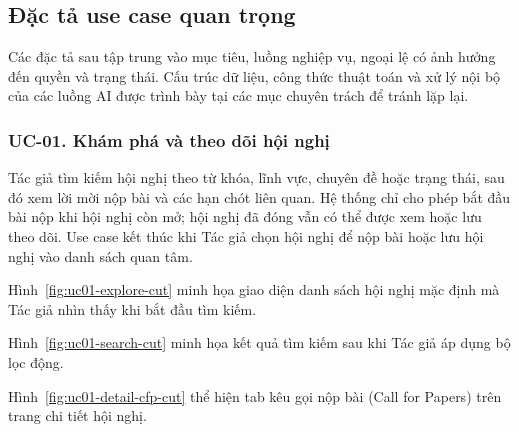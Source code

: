 \subsection{Đặc tả use case quan trọng}
\label{subsec:ch3-usecase-details-cut}

Các đặc tả sau tập trung vào mục tiêu, luồng nghiệp vụ, ngoại lệ có ảnh hưởng đến quyền và trạng thái. Cấu trúc dữ liệu, công thức thuật toán và xử lý nội bộ của các luồng AI được trình bày tại các mục chuyên trách để tránh lặp lại.

\subsubsection{UC-01. Khám phá và theo dõi hội nghị}

Tác giả tìm kiếm hội nghị theo từ khóa, lĩnh vực, chuyên đề hoặc trạng thái, sau đó xem lời mời nộp bài và các hạn chót liên quan. Hệ thống chỉ cho phép bắt đầu bài nộp khi hội nghị còn mở; hội nghị đã đóng vẫn có thể được xem hoặc lưu theo dõi. Use case kết thúc khi Tác giả chọn hội nghị để nộp bài hoặc lưu hội nghị vào danh sách quan tâm.


Hình~\ref{fig:uc01-explore-cut} minh họa giao diện danh sách hội nghị mặc định mà Tác giả nhìn thấy khi bắt đầu tìm kiếm.


Hình~\ref{fig:uc01-search-cut} minh họa kết quả tìm kiếm sau khi Tác giả áp dụng bộ lọc động.


Hình~\ref{fig:uc01-detail-cfp-cut} thể hiện tab kêu gọi nộp bài (Call for Papers) trên trang chi tiết hội nghị.

